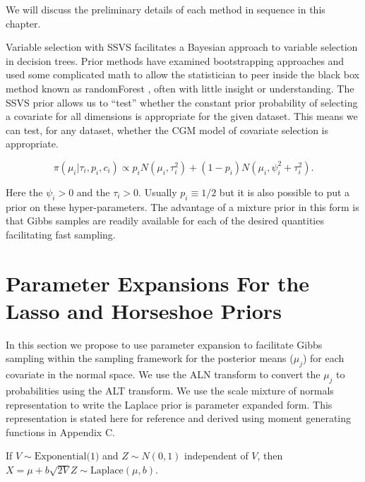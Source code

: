 We will discuss the preliminary details of each method in sequence in this chapter. 

Variable selection with SSVS facilitates a Bayesian approach to variable selection in decision trees. Prior methods have examined bootstrapping approaches and used some complicated math to allow the statistician to peer inside the black box method known as randomForest \cite{ishwaran2010high, ishwaran2007variable}, often with little insight or understanding. The SSVS prior allows us to ``test'' whether the constant prior probability of selecting a covariate for all dimensions is appropriate for the given dataset. This means we can test, for any dataset, whether the CGM model of covariate selection is appropriate.


\begin{equation}
\pi(\mu_i\vert \tau_i, p_i, c_i) \propto p_iN(\mu_i, \tau_i^2)+(1-p_i)N(\mu_i, \psi^2_i+\tau_i^2).
\end{equation}

Here the $\psi_i >0$ and the $\tau_i>0$. Usually $p_i\equiv1/2$ but it is also possible to put a prior on these hyper-parameters. The advantage of a mixture prior in this form is that Gibbs samples are readily available for each of the desired quantities facilitating fast sampling.     

\section{Parameter Expansions For the Lasso and Horseshoe Priors}\label{sec:PX_2}
In this section we propose to use parameter expansion to facilitate Gibbs sampling within the sampling framework for the posterior means ($\mu_j$) for each covariate in the normal space. We use the ALN transform to convert the $\mu_j$ to probabilities using the ALT transform. 
We use the scale mixture of normals representation to write the Laplace prior is parameter expanded form. This representation is stated here for reference and derived using moment generating functions in Appendix C.

If $V \sim \text{Exponential(1)}$ and $Z \sim N(0, 1)$ independent of $V$, then $X = \mu + b \sqrt{2 V}Z \sim \mathrm{Laplace}(\mu,b)$. 


